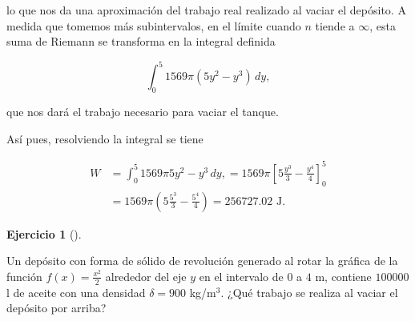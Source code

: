 \documentclass[
  a4paper,
]{scrreport}
\theoremstyle{definition}
\newtheorem{exercise}{Ejercicio}[chapter]
\theoremstyle{remark}
\begin{document}
\begin{tcolorbox}
lo que nos da una aproximación del trabajo real realizado al vaciar el
depósito. A medida que tomemos más subintervalos, en el límite cuando
\(n\) tiende a \(\infty\), esta suma de Riemann se transforma en la
integral definida

\[
\int_0^5 1569 \pi (5y^2-y^3)\,dy,
\]

que nos dará el trabajo necesario para vaciar el tanque.

Así pues, resolviendo la integral se tiene

\begin{align*}
W 
&= \int_0^5 1569 \pi 5y^2-y^3\,dy,
= 1569\pi \left[5\frac{y^3}{3}-\frac{y^4}{4}\right]_0^5 \\
&= 1569\pi\left(5\frac{5^3}{3}-\frac{5^4}{4}\right)
= 256727.02 \mbox{ J.}
\end{align*}

\end{tcolorbox}

\begin{exercise}[]\protect\hypertarget{exr-trabajo-deposito-2}{}\label{exr-trabajo-deposito-2}

Un depósito con forma de sólido de revolución generado al rotar la
gráfica de la función \(f(x)=\frac{x^2}{2}\) alrededor del eje \(y\) en
el intervalo de \(0\) a \(4\) m, contiene \(100000\) l de aceite con una
densidad \(\delta = 900\) kg/m\(^3\). ¿Qué trabajo se realiza al vaciar
el depósito por arriba?

\end{exercise}
\end{document}
